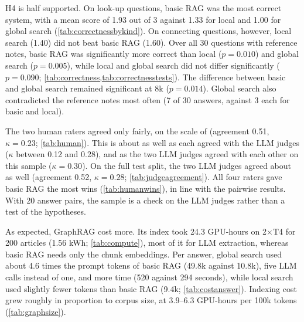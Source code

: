 \documentclass{article}
\begin{document}
\begin{table}[t]
\caption{Correctness on the look-up and connecting questions of the test split: coverage of the
reference notes, 0--3 (Opus grader). Contradicts: answers that contradict the notes.}
\label{tab:correctness}
\vskip 0.05in
\begin{center}\begin{small}

\end{small}\end{center}
\end{table}

H4 is half supported. On look-up questions, basic RAG was the most correct system, with a mean
score of 1.93 out of 3 against 1.33 for local and 1.00 for global search
(\cref{tab:correctnessbykind}). On connecting questions, however, local search (1.40) did not beat
basic RAG (1.60). Over all 30 questions with reference notes, basic RAG was significantly more correct
than local ($p = 0.010$) and global search ($p = 0.005$), while local and global search did not differ
significantly ($p = 0.090$; \cref{tab:correctness,tab:correctnesstests}). The difference between
basic and global search remained significant at 8k ($p = 0.014$). Global search also contradicted the
reference notes most often (7 of 30 answers, against 3 each for basic and local).

The two human raters agreed only fairly, on the scale of \citet{landis1977measurement} (agreement 0.51,
$\kappa = 0.23$; \cref{tab:human}). This is about as well as each agreed with the LLM judges ($\kappa$
between 0.12 and 0.28), and as the two LLM judges agreed with each other on this sample ($\kappa = 0.30$).
On the full test split, the two LLM judges agreed about as well (agreement 0.52, $\kappa = 0.28$;
\cref{tab:judgeagreement}). All four
raters gave basic RAG the most wins (\cref{tab:humanwins}), in line with the pairwise results. With
20 answer pairs, the sample is a check on the LLM judges rather than a test of the hypotheses.

As expected, GraphRAG cost more. Its index took 24.3 GPU-hours on 2$\times$T4 for 200 articles
(1.56 kWh; \cref{tab:compute}), most of it for LLM extraction, whereas basic RAG needs only the chunk
embeddings. Per answer, global search used about 4.6 times the prompt tokens of basic RAG (49.8k against
10.8k), five LLM calls instead of one, and more time (520 against 294 seconds), while local
search used slightly fewer tokens than basic RAG (9.4k; \cref{tab:costanswer}). Indexing cost grew
roughly in proportion to corpus size, at 3.9--6.3 GPU-hours per 100k tokens (\cref{tab:graphsize}).
\end{document}
